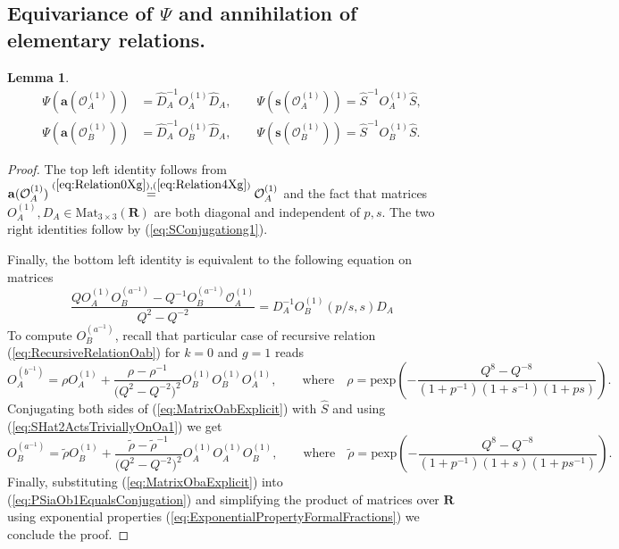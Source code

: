 \documentclass{amsart}
\newtheorem{lemma}[theorem]{Lemma}
\newcommand{\Oa}{\mathcal O_A}
\newcommand{\Ob}{\mathcal O_B}
\begin{document}
\subsection{Equivariance of $\Psi$ and annihilation of elementary relations.}

\begin{lemma}
\begin{subequations}
\begin{align}
\Psi(\mathbf a(\Oa^{(1)}))&=\widehat D_A^{-1}O_A^{(1)}\widehat D_A,\qquad \Psi(\mathbf s(\Oa^{(1)}))=\widehat S^{-1} O_A^{(1)}\widehat S,\\
\Psi(\mathbf a(\Ob^{(1)}))&=\widehat D_A^{-1}O_B^{(1)}\widehat D_A,\qquad \Psi(\mathbf s(\Ob^{(1)}))=\widehat S^{-1}O_B^{(1)}\widehat S.
\end{align}
\label{eq:HomomorphismPropertyg1}
\end{subequations}
\label{lemm:MCGEquivarianceBaseOfInduction}
\end{lemma}
\begin{proof}
The top left identity follows from $\mathbf a(\Oa^{(1)})\overset{(\ref{eq:Relation0Xg}),(\ref{eq:Relation4Xg})}{=}\Oa^{(1)}$ and the fact that matrices $O_A^{(1)},D_A\in\mathrm{Mat}_{3\times3}(\mathbf R)$ are both diagonal and independent of $p,s$. The two right identities follow by (\ref{eq:SConjugationg1}).

Finally, the bottom left identity is equivalent to the following equation on matrices
\begin{equation}
\frac{Q O_A^{(1)}O_B^{(a^{-1})}-Q^{-1}O_B^{(a^{-1})}\Oa^{(1)}}{Q^2-Q^{-2}}=D_A^{-1}O_B^{(1)}(p/s,s)D_A
\label{eq:PSiaOb1EqualsConjugation}
\end{equation}
To compute $O_B^{(a^{-1})}$, recall that particular case of recursive relation (\ref{eq:RecursiveRelationOab}) for $k=0$ and $g=1$ reads
\begin{equation}
O_A^{(b^{-1})}=\rho O_A^{(1)}+\frac{\rho-\rho^{-1}}{\big(Q^2-Q^{-2}\big)^2} O_B^{(1)}O_B^{(1)}O_A^{(1)},\qquad\textrm{where}\quad \rho=\mathrm{pexp}\left(-\frac{Q^8-Q^{-8}}{(1+p^{-1})(1+s^{-1})(1+ps)}\right).
\label{eq:MatrixOabExplicit}
\end{equation}
Conjugating both sides of (\ref{eq:MatrixOabExplicit}) with $\widehat S$ and using (\ref{eq:SHat2ActsTriviallyOnOa1}) we get
\begin{equation}
O_B^{(a^{-1})}=\widetilde\rho O_B^{(1)}+\frac{\widetilde\rho-\widetilde\rho^{-1}}{\big(Q^2-Q^{-2}\big)^2}O_A^{(1)}O_A^{(1)}O_B^{(1)},\qquad\textrm{where}\quad\widetilde\rho=\mathrm{pexp}\left(-\frac{Q^8-Q^{-8}}{(1+p^{-1})(1+s)(1+ps^{-1})}\right).
\label{eq:MatrixObaExplicit}
\end{equation}
Finally, substituting (\ref{eq:MatrixObaExplicit}) into (\ref{eq:PSiaOb1EqualsConjugation}) and simplifying the product of matrices over $\mathbf R$ using exponential properties (\ref{eq:ExponentialPropertyFormalFractions}) we conclude the proof.
\end{proof}
\end{document}
